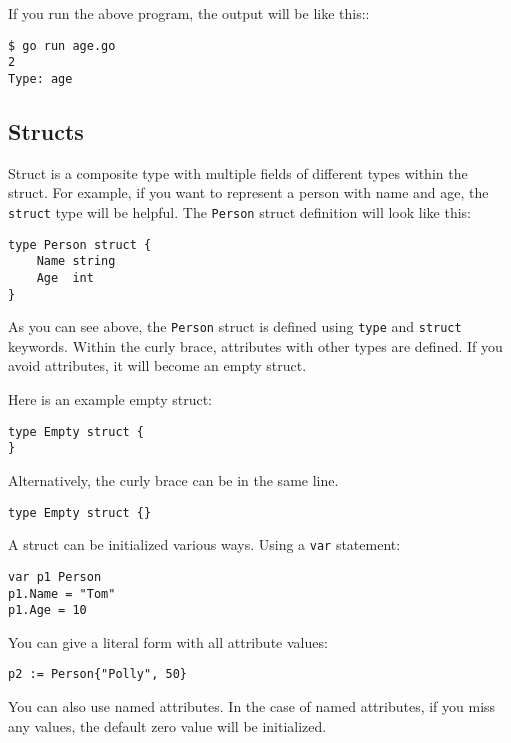 If you run the above program, the output will be like this::

\begin{lstlisting}[numbers=none]
$ go run age.go
2
Type: age
\end{lstlisting}

\subsection{Structs}

Struct is a composite type with multiple fields of
different types within the struct.  For example, if you want to
represent a person with name and age, the \texttt{struct} type will be
helpful.  The \texttt{Person} struct definition will look like this:

\begin{lstlisting}[numbers=none]
type Person struct {
    Name string
    Age  int
}
\end{lstlisting}

As you can see above, the \texttt{Person} struct is defined
using \texttt{type} and \texttt{struct} keywords.  Within the curly
brace, attributes with other types are defined.  If you avoid
attributes, it will become an empty struct.

Here is an example empty struct:

\begin{lstlisting}[numbers=none]
type Empty struct {
}
\end{lstlisting}

Alternatively, the curly brace can be in the same line.

\begin{lstlisting}[numbers=none]
type Empty struct {}
\end{lstlisting}

A struct can be initialized various ways.  Using a \texttt{var}
statement:

\begin{lstlisting}[numbers=none]
var p1 Person
p1.Name = "Tom"
p1.Age = 10
\end{lstlisting}

You can give a literal form with all attribute values:

\begin{lstlisting}[numbers=none]
p2 := Person{"Polly", 50}
\end{lstlisting}

You can also use named attributes.  In the case of named attributes,
if you miss any values, the default zero value will be initialized.

